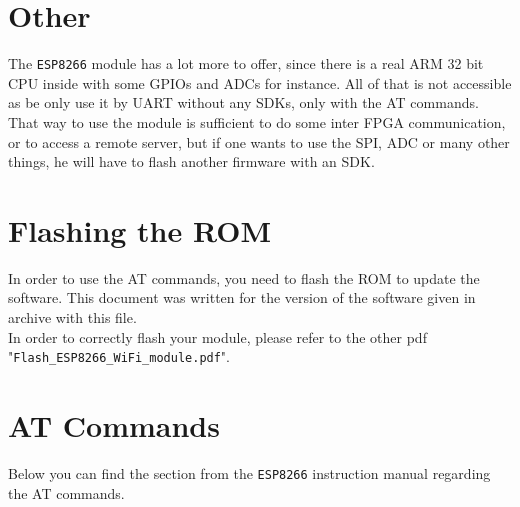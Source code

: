\documentclass[11pt]{article}
\begin{document}
\section{Other}
The \texttt{ESP8266} module has a lot more to offer, since there is a real ARM 32 bit CPU inside with some GPIOs and ADCs for instance. All of that is not accessible as be only use it by UART without any SDKs, only with the AT commands. That way to use the module is sufficient to do some inter FPGA communication, or to access a remote server, but if one wants to use the SPI, ADC or many other things, he will have to flash another firmware with an SDK.
\newpage
\begin{appendices}
\section{Flashing the ROM}
In order to use the AT commands, you need to flash the ROM to update the software. This document was written for the version of the software given in archive with this file.\\
In order to correctly flash your module, please refer to the other pdf "\texttt{Flash\_ESP8266\_WiFi\_module.pdf}".
\section{AT Commands}
Below you can find the section from the \texttt{ESP8266} instruction manual regarding the AT commands.




\end{appendices}
\end{document}
